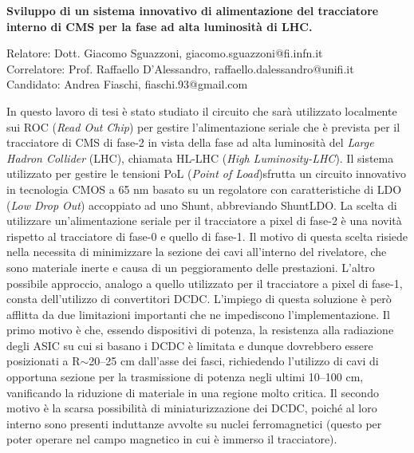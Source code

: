 \documentclass[a4paper,12pt,italian]{article}
\begin{document}
\pagestyle{plain}
\noindent

\begin{center}
\textbf{Sviluppo di un sistema innovativo di alimentazione del tracciatore interno di CMS per la fase ad alta luminosità di LHC.}
\end{center}
\begin{center}
Relatore: Dott. Giacomo Sguazzoni, giacomo.sguazzoni@fi.infn.it \\
Correlatore: Prof. Raffaello D'Alessandro, raffaello.dalessandro@unifi.it \\
Candidato: Andrea Fiaschi, fiaschi.93@gmail.com
\end{center}


In questo lavoro di tesi è stato studiato il circuito che sarà utilizzato localmente sui ROC (\textit{Read Out Chip}) per gestire l'alimentazione seriale che è prevista per il tracciatore di CMS di fase-2 in vista della fase ad alta luminosità del \textit{Large Hadron Collider} (LHC), chiamata HL-LHC (\textit{High Luminosity-LHC}). 
Il sistema utilizzato per gestire le tensioni PoL (\textit{Point of Load})sfrutta un circuito innovativo in tecnologia CMOS a 65 nm basato su un regolatore con caratteristiche di LDO (\textit{Low Drop Out}) accoppiato ad uno Shunt, abbreviando ShuntLDO. 
La scelta di utilizzare un'alimentazione seriale per il tracciatore a pixel di fase-2 è una novità rispetto al tracciatore di fase-0 e quello di fase-1. Il motivo di questa scelta risiede nella necessita di minimizzare la sezione dei cavi all'interno del rivelatore, che sono materiale inerte e causa di un peggioramento delle prestazioni. 
L'altro possibile approccio, analogo a quello utilizzato per il tracciatore a pixel di fase-1, consta dell'utilizzo di convertitori DCDC. L'impiego di questa soluzione è però afflitta da due limitazioni importanti che ne impediscono l'implementazione. 
Il primo motivo è che, essendo dispositivi di potenza, la resistenza alla radiazione degli ASIC su cui si basano i DCDC è limitata e dunque dovrebbero essere posizionati a R$\sim$20--25 cm dall'asse dei fasci, richiedendo l'utilizzo di cavi di opportuna sezione per la trasmissione di potenza negli ultimi 10--100 cm, vanificando la riduzione di materiale in una regione molto critica. 
Il secondo motivo è la scarsa possibilità di miniaturizzazione dei DCDC, poiché al loro interno sono presenti induttanze avvolte su nuclei ferromagnetici (questo per poter operare nel campo magnetico in cui è immerso il tracciatore). 
\end{document}
